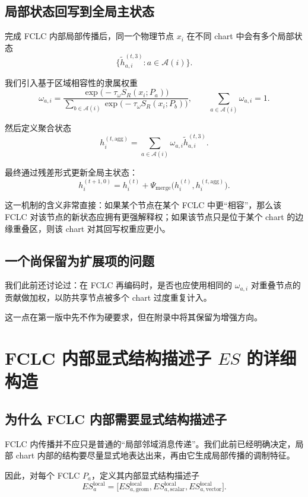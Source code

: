 \documentclass[12pt,a4paper]{ctexart}
\begin{document}
\subsection{局部状态回写到全局主状态}

完成 FCLC 内部局部传播后，同一个物理节点 \(x_i\) 在不同 chart 中会有多个局部状态
\[
\{\tilde h_{a,i}^{(t,3)}:a\in\mathcal A(i)\}.
\]

我们引入基于区域相容性的隶属权重
\[
\omega_{a,i}
=
\frac{
\exp\big(-\tau_\omega S_R(x_i;P_a)\big)
}{
\sum_{b\in\mathcal A(i)}
\exp\big(-\tau_\omega S_R(x_i;P_b)\big)
},
\qquad
\sum_{a\in\mathcal A(i)}\omega_{a,i}=1.
\]

然后定义聚合状态
\[
h_i^{(t,\mathrm{agg})}
=
\sum_{a\in\mathcal A(i)}
\omega_{a,i}\tilde h_{a,i}^{(t,3)}.
\]

最终通过残差形式更新全局主状态：
\[
h_i^{(t+1,0)}
=
h_i^{(t)}
+
\Psi_{\mathrm{merge}}
\big(
h_i^{(t)},
h_i^{(t,\mathrm{agg})}
\big).
\]

这一机制的含义非常直接：如果某个节点在某个 FCLC 中更“相容”，那么该 FCLC 对该节点的新状态应拥有更强解释权；如果该节点只是位于某个 chart 的边缘重叠区，则该 chart 对其回写权重应更小。

\subsection{一个尚保留为扩展项的问题}

我们此前还讨论过：在 FCLC 再编码时，是否也应使用相同的 \(\omega_{a,i}\) 对重叠节点的贡献做加权，以防共享节点被多个 chart 过度重复计入。

这一点在第一版中先不作为硬要求，但在附录中将其保留为增强方向。

\section{FCLC 内部显式结构描述子 \(ES\) 的详细构造}

\subsection{为什么 FCLC 内部需要显式结构描述子}

FCLC 内传播并不应只是普通的“局部邻域消息传递”。我们此前已经明确决定，局部 chart 内部的结构要尽量显式地表达出来，再由它生成局部传播的调制特征。

因此，对每个 FCLC \(P_a\)，定义其内部显式结构描述子
\[
ES_a^{\mathrm{local}}
=
\big[
ES_{a,\mathrm{geom}}^{\mathrm{local}},
ES_{a,\mathrm{scalar}}^{\mathrm{local}},
ES_{a,\mathrm{vector}}^{\mathrm{local}}
\big].
\]
\end{document}
